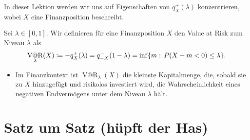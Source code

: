 \documentclass[a4paper,twoside,DIV15,BCOR12mm]{scrbook}
\makeatletter
\DeclareMathOperator{\VatR}{V@R}
\makeatother
\begin{document}
In dieser Lektion werden wir uns auf Eigenschaften von $q_X^+(\lambda)$ konzentrieren, wobei $X$ eine Finanzposition beschreibt.

\begin{definition}
Sei $\lambda\in[0,1]$. Wir definieren für eine Finanzposition $X$ den Value at Risk zum Niveau $\lambda$ als 
\[
\VatR_\lambda(X) \da -q_X^+(\lambda)=q_{-X}^-(1-\lambda)=\inf\{m:\,  P(X+m<0)\leq \lambda\}.
\]
\end{definition}

\begin{bemerkung}
\begin{itemize}
\item Im Finanzkontext ist $\VatR_\lambda(X)$ die kleinste Kapitalmenge, die, sobald sie zu $X$ hinzugefügt und risikolos investiert wird, die Wahrscheinlichkeit eines negativen Endvermögens unter dem Niveau $\lambda$ hält.
\end{itemize}
\end{bemerkung}


\setcounter{secnumdepth}{-1}
\chapter{Satz um Satz (hüpft der Has)}

\renewcommand{\indexname}{Stichwortverzeichnis}
\printindex
\end{document}
